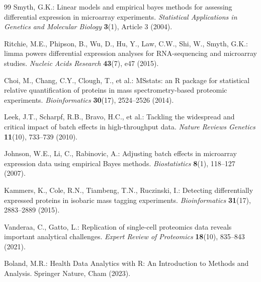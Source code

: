 \documentclass[11pt,twoside,openright]{book}
\begin{document}
\begin{thebibliography}{99}
Smyth, G.K.: Linear models and empirical bayes methods for assessing differential expression in microarray experiments.
\textit{Statistical Applications in Genetics and Molecular Biology} \textbf{3}(1), Article 3 (2004).

Ritchie, M.E., Phipson, B., Wu, D., Hu, Y., Law, C.W., Shi, W., Smyth, G.K.: limma powers differential expression analyses for RNA-sequencing and microarray studies.
\textit{Nucleic Acids Research} \textbf{43}(7), e47 (2015).

Choi, M., Chang, C.Y., Clough, T., et al.: MSstats: an R package for statistical relative quantification of proteins in mass spectrometry-based proteomic experiments.
\textit{Bioinformatics} \textbf{30}(17), 2524--2526 (2014).

Leek, J.T., Scharpf, R.B., Bravo, H.C., et al.: Tackling the widespread and critical impact of batch effects in high-throughput data.
\textit{Nature Reviews Genetics} \textbf{11}(10), 733--739 (2010).

Johnson, W.E., Li, C., Rabinovic, A.: Adjusting batch effects in microarray expression data using empirical Bayes methods.
\textit{Biostatistics} \textbf{8}(1), 118--127 (2007).

Kammers, K., Cole, R.N., Tiambeng, T.N., Ruczinski, I.: Detecting differentially expressed proteins in isobaric mass tagging experiments.
\textit{Bioinformatics} \textbf{31}(17), 2883--2889 (2015).

Vanderaa, C., Gatto, L.: Replication of single-cell proteomics data reveals important analytical challenges.
\textit{Expert Review of Proteomics} \textbf{18}(10), 835--843 (2021).

Boland, M.R.: Health Data Analytics with R: An Introduction to Methods and Analysis.
Springer Nature, Cham (2023).

\end{thebibliography}
\end{document}
